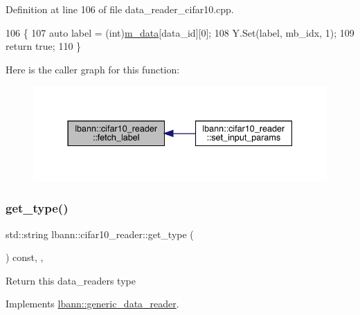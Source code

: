 Definition at line 106 of file data\+\_\+reader\+\_\+cifar10.\+cpp.


\begin{DoxyCode}
106                                                                          \{
107   \textcolor{keyword}{auto} label = (int)\hyperlink{classlbann_1_1cifar10__reader_a9b47dab5c16987441ec5276d91a5aab5}{m\_data}[data\_id][0];
108   Y.Set(label, mb\_idx, 1);
109   \textcolor{keywordflow}{return} \textcolor{keyword}{true};
110 \}
\end{DoxyCode}
Here is the caller graph for this function\+:\nopagebreak
\begin{figure}[H]
\begin{center}
\leavevmode
\includegraphics[width=337pt]{classlbann_1_1cifar10__reader_a7419de03462b5ff38b8174695a9c06dd_icgraph}
\end{center}
\end{figure}
\mbox{\label{classlbann_1_1cifar10__reader_a0922990dbef860040a7ec2a99a3d3ba2}} 
\subsubsection{\texorpdfstring{get\+\_\+type()}{get\_type()}}
{\footnotesize\ttfamily std\+::string lbann\+::cifar10\+\_\+reader\+::get\+\_\+type (\begin{DoxyParamCaption}{ }\end{DoxyParamCaption}) const\hspace{0.3cm}{\ttfamily [inline]}, {\ttfamily [override]}, {\ttfamily [virtual]}}

Return this data\+\_\+reader\textquotesingle{}s type 

Implements \hyperlink{classlbann_1_1generic__data__reader_abeb849fb8e10b4fa317c90bc33f61758}{lbann\+::generic\+\_\+data\+\_\+reader}.




